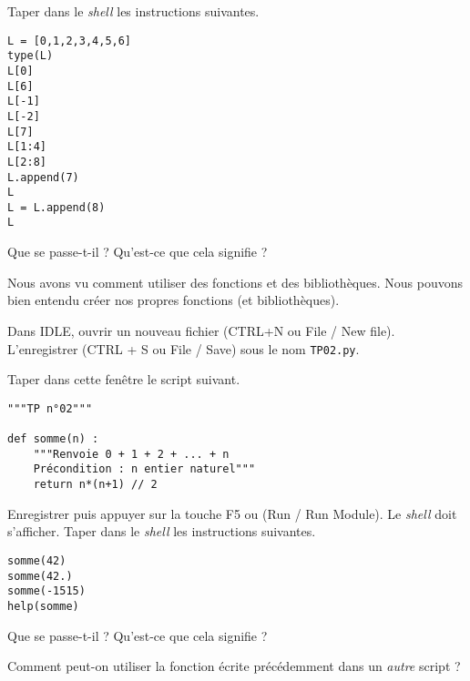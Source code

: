 \medskip{}

\question{} Taper dans le \emph{shell} les instructions suivantes. 
\begin{verbatim}
L = [0,1,2,3,4,5,6]
type(L)
L[0]
L[6]
L[-1]
L[-2]
L[7]
L[1:4]
L[2:8]
L.append(7)
L
L = L.append(8)
L
\end{verbatim}
Que se passe-t-il ? Qu'est-ce que cela signifie ?

\medskip{}

Nous avons vu comment utiliser des fonctions et des bibliothèques. Nous pouvons bien entendu créer nos propres fonctions (et bibliothèques). 

Dans IDLE, ouvrir un nouveau fichier (CTRL+N ou File / New file). L'enregistrer (CTRL + S ou File / Save) sous le nom \texttt{TP02.py}. 

\medskip{}

\question{} Taper dans cette fenêtre le script suivant. 
\begin{verbatim}
"""TP n°02"""

def somme(n) : 
    """Renvoie 0 + 1 + 2 + ... + n
    Précondition : n entier naturel"""
    return n*(n+1) // 2 
\end{verbatim}
Enregistrer puis appuyer sur la touche F5 ou (Run / Run Module).
Le \emph{shell} doit s'afficher. 
Taper dans le \emph{shell} les instructions suivantes. 
\begin{verbatim}
somme(42)
somme(42.)
somme(-1515)
help(somme)
\end{verbatim}
Que se passe-t-il ? Qu'est-ce que cela signifie ?

\medskip{}

\question{} Comment peut-on utiliser la fonction écrite précédemment dans un \emph{autre} script \python{} ? 